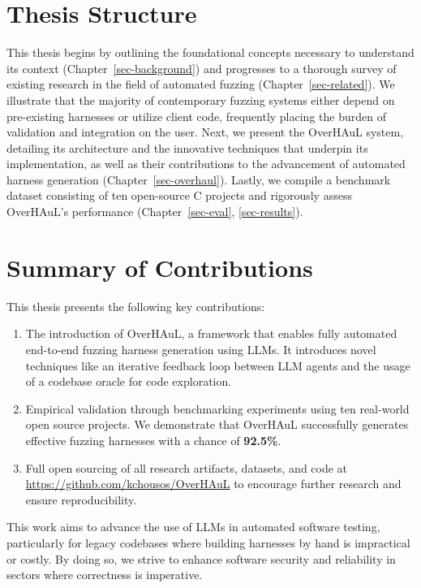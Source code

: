 \documentclass[
  a4paper,
]{scrreprt}
\providecommand{\tightlist}{%
  \setlength{\itemsep}{0pt}\setlength{\parskip}{0pt}}
\theoremstyle{definition}
\theoremstyle{remark}
\begin{document}
\section{Thesis Structure}\label{thesis-structure}

This thesis begins by outlining the foundational concepts necessary to
understand its context (Chapter~\ref{sec-background}) and progresses to
a thorough survey of existing research in the field of automated fuzzing
(Chapter~\ref{sec-related}). We illustrate that the majority of
contemporary fuzzing systems either depend on pre-existing harnesses or
utilize client code, frequently placing the burden of validation and
integration on the user. Next, we present the OverHAuL system, detailing
its architecture and the innovative techniques that underpin its
implementation, as well as their contributions to the advancement of
automated harness generation (Chapter~\ref{sec-overhaul}). Lastly, we
compile a benchmark dataset consisting of ten open-source C projects and
rigorously assess OverHAuL's performance
(Chapter~\ref{sec-eval}, \ref{sec-results}).

\section{Summary of Contributions}\label{summary-of-contributions}

This thesis presents the following key contributions:

\begin{enumerate}
\def\labelenumi{\arabic{enumi}.}
\tightlist
\item
  The introduction of OverHAuL, a framework that enables fully automated
  end-to-end fuzzing harness generation using LLMs. It introduces novel
  techniques like an iterative feedback loop between LLM agents and the
  usage of a codebase oracle for code exploration.
\item
  Empirical validation through benchmarking experiments using ten
  real-world open source projects. We demonstrate that OverHAuL
  successfully generates effective fuzzing harnesses with a chance of
  \textbf{92.5\%}.
\item
  Full open sourcing of all research artifacts, datasets, and code at
  \url{https://github.com/kchousos/OverHAuL} to encourage further
  research and ensure reproducibility.
\end{enumerate}

This work aims to advance the use of LLMs in automated software testing,
particularly for legacy codebases where building harnesses by hand is
impractical or costly. By doing so, we strive to enhance software
security and reliability in sectors where correctness is imperative.
\end{document}
